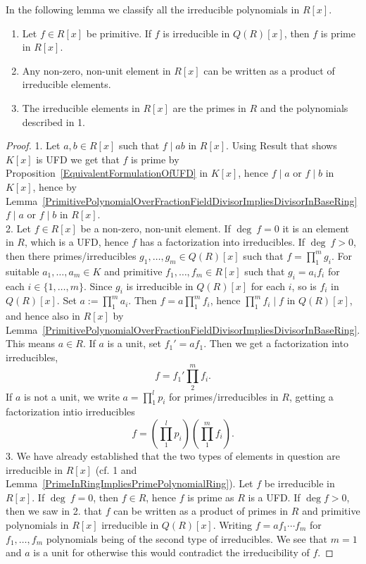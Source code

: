 In the following lemma we classify all the irreducible polynomials in $R[x]$.
\begin{lemma}\label{ClassificationOfIrreducibles}
    \begin{enumerate}
        \item Let $f\in R[x]$ be primitive. If $f$ is irreducible in $Q(R)[x]$, then $f$ is prime in $R[x]$. 
        \item Any non-zero, non-unit element in $R[x]$ can be written as a product of irreducible elements. 
        \item The irreducible elements in $R[x]$ are the primes in $R$ and the polynomials described in 1.
    \end{enumerate}
\end{lemma}
\begin{proof}
    1. Let $a,b\in R[x]$ such that $f\mid ab$ in $R[x]$. Using {\Large Result that shows $K[x]$ is UFD} we get that $f$ is prime by Proposition~\ref{EquivalentFormulationOfUFD} in $K[x]$, hence $f \mid a$ or $f \mid b$ in $K[x]$, hence by Lemma~\ref{PrimitivePolynomialOverFractionFieldDivisorImpliesDivisorInBaseRing} $f\mid a$ or $f\mid b$ in $R[x]$.\\
    2. Let $f\in R[x]$ be a non-zero, non-unit element. If $\deg \ f =0$ it is an element in $R$, which is a UFD, hence $f$ has a factorization into irreducibles. If $\deg \ f>0$, then there primes/irreducibles $g_1,\dots,g_m\in Q(R)[x]$ such that $f = \prod_1^m g_i$. For suitable $a_1,\dots,a_m\in K$ and primitive $f_1,\dots,f_m\in R[x]$ such that $g_i = a_if_i$ for each $i\in\{1,\dots,m\}$. Since $g_i$ is irreducible in $Q(R)[x]$ for each $i$, so is $f_i$ in $Q(R)[x]$. Set $a := \prod_1^m a_i$. Then $f = a\prod_1^m f_i$, hence $\prod_1^m f_i \mid f$ in $Q(R)[x]$, and hence also in $R[x]$ by Lemma~\ref{PrimitivePolynomialOverFractionFieldDivisorImpliesDivisorInBaseRing}. This means $a \in R$. If $a$ is a unit, set $f_1' = af_1$. Then we get a factorization into irreducibles,
    $$f = f_1'\prod_2^mf_i.$$
    If $a$ is not a unit, we write $a = \prod_1^l p_i$ for primes/irreducibles in $R$, getting a factorization intio irreducibles
    $$f = \left(\prod_1^l p_i \right)\left(\prod_1^m f_i\right).$$
    3. We have already established that the two types of elements in question are irreducible in $R[x]$ (cf. 1 and Lemma~\ref{PrimeInRingImpliesPrimePolynomialRing}). Let $f$ be irreducible in $R[x]$. If $\deg\ f = 0$, then $f\in R$, hence $f$ is prime as $R$ is a UFD. If $\deg f>0$, then we saw in 2. that  $f$ can be written as a product of primes in $R$ and primitive polynomials in $R[x]$ irreducible in $Q(R)[x]$. Writing $f = a f_1\cdots f_m $ for $f_1,\dots,f_m$ polynomials being of the second type of irreducibles. We see that $m=1$ and $a$ is a unit for otherwise this would contradict the irreducibility of $f$.   
\end{proof}
